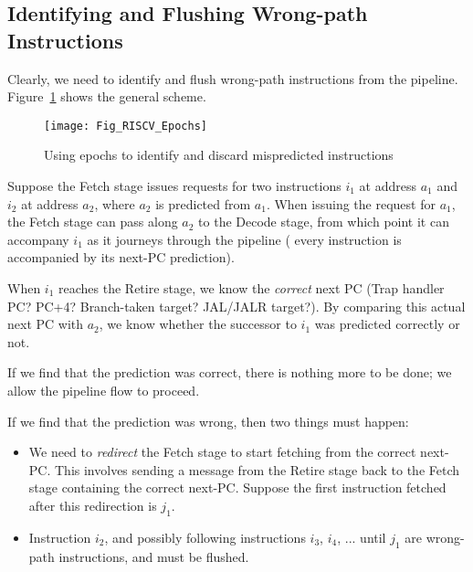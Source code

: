 
\subsection{Identifying and Flushing Wrong-path Instructions}

Clearly, we need to identify and flush wrong-path instructions from
the pipeline.  Figure~\ref{Fig_RISCV_Epochs} shows the general scheme.
\begin{figure}[htbp]
  \centerline{\texttt{[image: Fig\_RISCV\_Epochs]}}
  \caption{\label{Fig_RISCV_Epochs}
           Using epochs to identify and discard mispredicted instructions}
\end{figure}

Suppose the Fetch stage issues requests for two instructions $i_1$ at
address $a_1$ and $i_2$ at address $a_2$, where $a_2$ is predicted
from $a_1$.  When issuing the request for $a_1$, the Fetch stage can
pass along $a_2$ to the Decode stage, from which point it can
accompany $i_1$ as it journeys through the pipeline ({\ie} every
instruction is accompanied by its next-PC prediction).

When $i_1$ reaches the Retire stage, we know the \emph{correct} next
PC (Trap handler PC?  PC+4?  Branch-taken target?  JAL/JALR target?).
By comparing this actual next PC with $a_2$, we know whether the
successor to $i_1$ was predicted correctly or not.

If we find that the prediction was correct, there is nothing more to
be done; we allow the pipeline flow to proceed.


If we find that the prediction was wrong, then two things must happen:

\begin{itemize}

  \item We need to \emph{redirect} the Fetch stage to start fetching
    from the correct next-PC.  This involves sending a message from
    the Retire stage back to the Fetch stage containing the correct
    next-PC.  Suppose the first instruction fetched after this
    redirection is $j_1$.

  \item Instruction $i_2$, and possibly following instructions $i_3$,
    $i_4$, ... until $j_1$ are wrong-path instructions, and must be
    flushed.

\end{itemize}

